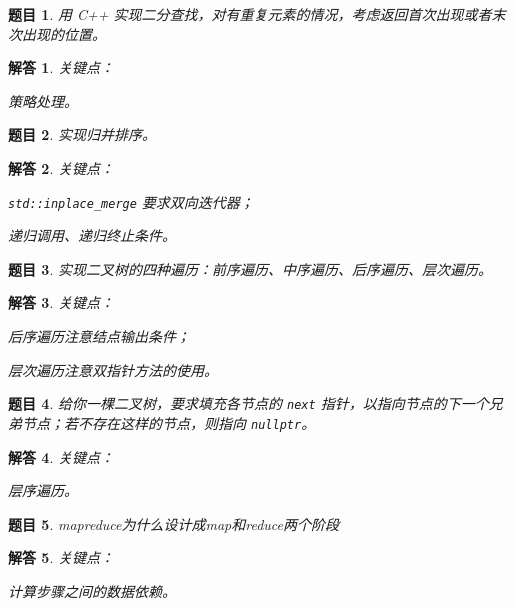 \documentclass[UTF8, final]{ctexart}
\newtheorem{question}{题目}
\newtheorem{solution}{解答}
\begin{document}
\begin{question}
用 C++ 实现二分查找，对有重复元素的情况，考虑返回首次出现或者末次出现的位置。
\end{question}
\begin{solution}
关键点：
\begin{compactitem}
    \item 策略处理。
\end{compactitem}

\end{solution}

\begin{question}
实现归并排序。
\end{question}
\begin{solution}
关键点：
\begin{compactitem}
    \item \lstinline[style = lcpp]|std::inplace_merge| 要求双向迭代器；
    \item 递归调用、递归终止条件。
\end{compactitem}

\end{solution}

\begin{question}
实现二叉树的四种遍历：前序遍历、中序遍历、后序遍历、层次遍历。
\end{question}
\begin{solution}
关键点：
\begin{compactitem}
    \item 后序遍历注意结点输出条件；
    \item 层次遍历注意双指针方法的使用。
\end{compactitem}

\end{solution}

\begin{question}
给你一棵二叉树，要求填充各节点的 \lstinline[style = lcpp]|next| 指针，以指向节点的下一个兄弟节点；若不存在这样的节点，则指向 \lstinline[style = lcpp]|nullptr|。
\end{question}
\begin{solution}
关键点：
\begin{compactitem}
    \item 层序遍历。
\end{compactitem}

\end{solution}

\begin{question}
mapreduce为什么设计成map和reduce两个阶段
\end{question}
\begin{solution}
关键点：
\begin{compactitem}
    \item 计算步骤之间的数据依赖。
\end{compactitem}
\end{solution}
\end{document}
